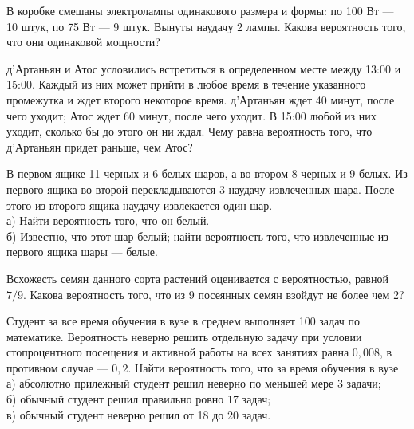 \newpage\setcounter{zad}{0}



\begin{zkrW}{20}\noindent 
	В коробке смешаны электролампы одинакового размера и формы: по 100 Вт --- 10 штук, по 75 Вт --- 9 штук. Вынуты наудачу 2 лампы. Какова вероятность того, что они одинаковой мощности?
 
\end{zkrW}

\begin{zkrW}{20}\noindent 
	д'Артаньян и Атос условились встретиться в определенном месте между 13:00 и 15:00. Каждый из них может прийти в любое время в течение указанного промежутка и ждет второго некоторое время. д'Артаньян ждет 40 минут, после чего уходит; Атос ждет 60 минут, после чего уходит. В 15:00 любой из них уходит, сколько бы до этого он ни ждал. Чему равна вероятность того, что д'Артаньян придет раньше, чем Атос?
 
\end{zkrW}

\begin{zkrW}{20}\noindent 
	В первом ящике 11 черных и 6 белых шаров, а во втором 8 черных и 9 белых. Из первого ящика во второй перекладываются 3 наудачу извлеченных шара. После этого из второго ящика наудачу извлекается один шар. \\ \indent а) Найти вероятность того, что он белый. \\ \indent б) Известно, что этот шар белый; найти вероятность того, что извлеченные из первого ящика шары --- белые.
 
\end{zkrW}

\begin{zkrW}{20}\noindent 
	Всхожесть семян данного сорта растений оценивается с вероятностью, равной $7/9$. Какова вероятность того, что из 9 посеянных семян взойдут не более чем 2?
 
\end{zkrW}

\begin{zkrW}{20}\noindent 
	Студент за все время обучения в вузе в среднем выполняет 100 задач по математике. Вероятность неверно решить отдельную задачу при условии стопроцентного посещения и активной работы на всех занятиях равна $0{,}008$, в противном случае --- $0{,}2$. Найти вероятность того, что за время обучения в вузе \\ \indent а) абсолютно прилежный студент решил неверно по меньшей мере 3 задачи; \\ \indent б) обычный студент решил правильно ровно 17 задач; \\ \indent в) обычный студент неверно решил от 18 до 20 задач.
 
\end{zkrW}

